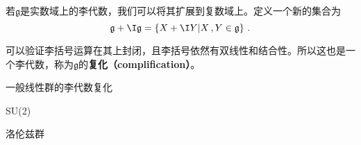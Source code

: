 

\begin{definition}{}
若$\mathfrak g$是实数域上的李代数，我们可以将其扩展到复数域上。定义一个新的集合为
\begin{equation}
\mathfrak g+\I \mathfrak g=\{X+\I Y|X\,,Y\in\mathfrak g\}~.
\end{equation}
\end{definition}
可以验证李括号运算在其上封闭，且李括号依然有双线性和结合性。所以这也是一个李代数，称为$\mathfrak g$的\textbf{复化（complification）}。
\begin{example}{一般线性群的李代数复化}

\end{example}
\begin{example}{SU(2)}

\end{example}
\begin{example}{洛伦兹群}

\end{example}